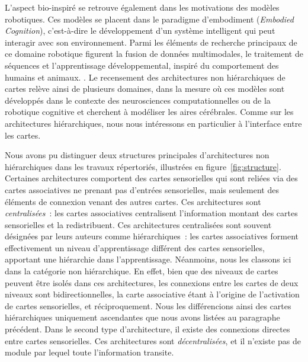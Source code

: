 \documentclass[../main]{subfiles}
\begin{document}
L'aspect bio-inspiré se retrouve également dans les motivations des modèles robotiques. Ces modèles se placent dans le paradigme d'embodiment (\emph{Embodied Cognition}), c'est-à-dire le développement d'un système intelligent qui peut interagir avec son environnement. Parmi les éléments de recherche principaux de ce domaine robotique figurent la fusion de données multimodales, le traitement de séquences et l'apprentissage développemental, inspiré du comportement des humains et animaux. \parencite{Smith2005TheDO}.
Le recensement des architectures non hiérarchiques de cartes relève ainsi de plusieurs domaines, dans la mesure où ces modèles sont développés dans le contexte des neurosciences computationnelles ou de la robotique cognitive et cherchent à modéliser les aires cérébrales. 
Comme sur les architectures hiérarchiques, nous nous intéressons en particulier à l'interface entre les cartes.


Nous avons pu distinguer deux structures principales d'architectures non hiérarchiques dans les travaux répertoriés, illustrées en figure~\ref{fig:structure}.
Certaines architectures comportent des cartes sensorielles qui sont reliées via des cartes associatives ne prenant pas d'entrées sensorielles, mais seulement des éléments de connexion venant des autres cartes. 
Ces architectures sont \emph{centralisées}~: les cartes associatives centralisent l'information montant des cartes sensorielles et la redistribuent. Ces architectures centralisées sont souvent désignées par leurs auteurs comme hiérarchiques~: les cartes associatives forment effectivement un niveau d'apprentissage différent des cartes sensorielles, apportant une hiérarchie dans l'apprentissage. 
Néanmoins, nous les classons ici dans la catégorie non hiérarchique. 
En effet, bien que des niveaux de cartes peuvent être isolés dans ces architectures, les connexions entre les cartes de deux niveaux sont bidirectionnelles, la carte associative étant à l'origine de l'activation de cartes sensorielles, et réciproquement.
Nous les différencions ainsi des cartes hiérarchiques uniquement ascendantes que nous avons listées au paragraphe précédent.
Dans le second type d'architecture, il existe des connexions directes entre cartes sensorielles. Ces architectures sont \emph{décentralisées}, et il n'existe pas de module par lequel toute l'information transite.
\end{document}
